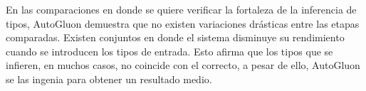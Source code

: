 En las comparaciones en donde se quiere verificar la fortaleza de la inferencia de tipos, AutoGluon demuestra que no existen variaciones drásticas entre las etapas 
comparadas. Existen conjuntos en donde el sistema disminuye su rendimiento cuando se introducen los tipos de entrada. Esto afirma que los tipos que se infieren, 
en muchos casos, no coincide con el correcto, a pesar de ello, AutoGluon se las ingenia para obtener un resultado medio.





